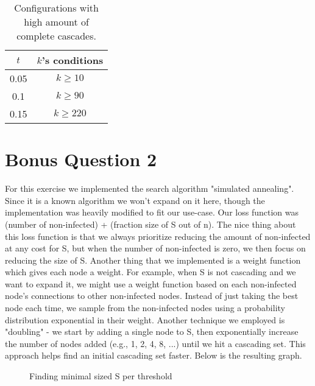 \documentclass{article}
\begin{document}
\begin{enumerate}[label=(\alph*)]
    \begin{table}[h]
        \centering
        \begin{tabular}{|c|c|}
            \hline
            $t$ & $k$'s conditions\\
            \hline
            0.05 & $k \geq 10$\\
            0.1 & $k \geq 90$\\
            0.15 & $k \geq 220$\\
            \hline
        \end{tabular}
        \caption{Configurations with high amount of complete cascades.}
        \label{tab:q9c-tab}
    \end{table}

\end{enumerate}

\section{Bonus Question 2}

For this exercise we implemented the search algorithm "simulated annealing". Since it is a known algorithm we won't expand on it here, though the implementation was heavily modified to fit our use-case. Our loss function was (number of non-infected) + (fraction size of S out of n). The nice thing about this loss function is that we always prioritize reducing the amount of non-infected at any cost for S, but when the number of non-infected is zero, we then focus on reducing the size of S. Another thing that we implemented is a weight function which gives each node a weight. For example, when S is not cascading and we want to expand it, we might use a weight function based on each non-infected node's connections to other non-infected nodes. Instead of just taking the best node each time, we sample from the non-infected nodes using a probability distribution exponential in their weight. Another technique we employed is "doubling" - we start by adding a single node to S, then exponentially increase the number of nodes added (e.g., 1, 2, 4, 8, ...) until we hit a cascading set. This approach helps find an initial cascading set faster. Below is the resulting graph.

\begin{figure}[h]
    \centering
    \resizebox{0.6\textwidth}{!}{
        
    }
    \caption{Finding minimal sized S per threshold}
    \label{fig:enter-label}
\end{figure}
\end{document}
